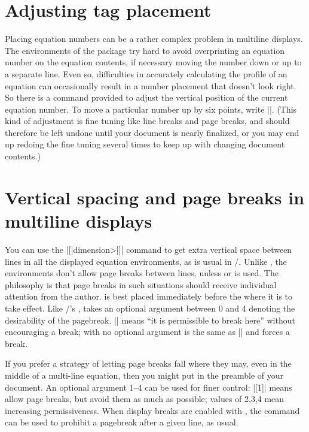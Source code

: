 \documentclass[leqno,titlepage,openany]{amsldoc}
\newcommand{\ii}[1]{#1\index{#1}}
\begin{document}
\section{Adjusting tag placement}

Placing equation numbers can be a rather complex problem in multiline
displays. The environments of the  package try hard to
avoid overprinting an equation number on the equation contents, if
necessary moving the number down or up to a separate line. Even so,
difficulties in accurately calculating the profile of an equation can
occasionally result in a number placement that doesn't look right. So
there is a  command provided to adjust the vertical
position of the current equation number. To move a particular number up
by six points, write |\raisetag{6pt}|. (This kind of adjustment is fine
tuning like line breaks and page breaks, and should therefore be left
undone until your document is nearly finalized, or you may end up
redoing the fine tuning several times to keep up with changing document
contents.)

\section{Vertical spacing and page breaks in multiline displays}

You can use the \cn{\\}|[|\<dimension>|]| command to get extra
vertical space between lines in all the  displayed
equation environments, as is usual in \latex/.  Unlike ,
the  environments don't allow \ii{page breaks} between
lines, unless  or  is used.
The philosophy is that page breaks in such situations should receive
individual attention from the author.  is best placed
immediately before the \cn{\\} where it is to take effect.  Like
\latex/'s ,  takes an optional argument
between 0 and 4 denoting the desirability of the pagebreak.
|\displaybreak[0]| means ``it is permissible to break here'' without
encouraging a break;  with no optional argument is
the same as |\displaybreak[4]| and forces a break.

If you prefer a strategy of letting page breaks fall where they may,
even in the middle of a multi-line equation, then you might put
 in the preamble of your document. An optional
argument 1--4 can be used for finer control: |[1]| means allow page
breaks, but avoid them as much as possible; values of 2,3,4 mean
increasing permissiveness. When display breaks are enabled with
, the \cn{\\*} command can be used to prohibit
a pagebreak after a given line, as usual.
\end{document}
